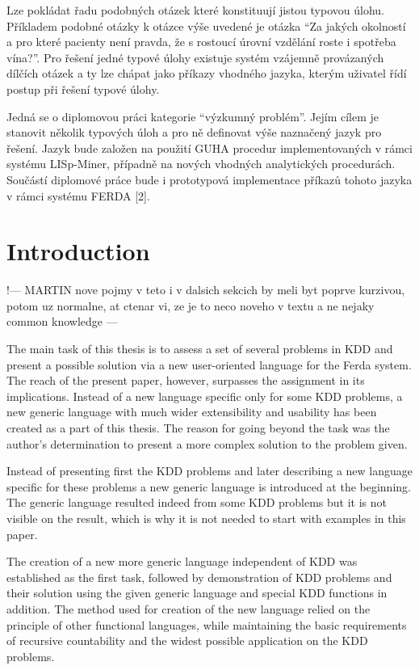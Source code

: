 \documentclass[a4paper,12pt]{book}
\newcommand{\uv}[1]{``#1''}
\begin{document}
Lze pokládat řadu podobných otázek které konstituují jistou typovou úlohu. Příkladem podobné otázky k otázce výše uvedené je otázka \uv{Za jakých okolností a pro které pacienty není pravda, že s rostoucí úrovní vzdělání roste i spotřeba vína?}. Pro řešení jedné typové úlohy existuje systém vzájemně provázaných dílčích otázek a ty lze chápat jako příkazy vhodného jazyka, kterým uživatel řídí postup při řešení typové úlohy.

Jedná se o diplomovou práci kategorie \uv{výzkumný problém}. Jejím cílem je stanovit několik typových úloh a pro ně definovat výše naznačený jazyk pro řešení. Jazyk bude založen na použití GUHA procedur implementovaných v rámci systému LISp-Miner, případně na nových vhodných analytických procedurách. Součástí diplomové práce bude i prototypová implementace příkazů tohoto jazyka v rámci systému FERDA [2].

\section*{Introduction}
!--- MARTIN nove pojmy v teto i v dalsich sekcich by meli byt poprve kurzivou, potom uz normalne, at ctenar vi, ze je to neco noveho v textu a ne nejaky common knowledge ---

The main task of this thesis is to assess a set of several problems in KDD and present a possible solution via a new user-oriented language for the Ferda system. The reach of the present paper, however, surpasses the assignment in its implications. Instead of a new language specific only for some KDD problems, a new generic language with much wider extensibility and usability has been created as a part of this thesis. The reason for going beyond the task was the author's determination to present a more complex solution to the problem given. 

Instead of presenting first the KDD problems and later describing a new language specific for these problems a new generic language is introduced at the beginning. The generic language resulted indeed from some KDD problems but it is not visible on the result, which is why it is not needed to start with examples in this paper.

The creation of a new more generic language independent of KDD was established as the first task, followed by demonstration of KDD problems and their solution using the given generic language and special KDD functions in addition. The method used for creation of the new language relied on the principle of other functional languages, while maintaining the basic requirements of recursive countability and the widest possible application on the KDD problems.
\end{document}
